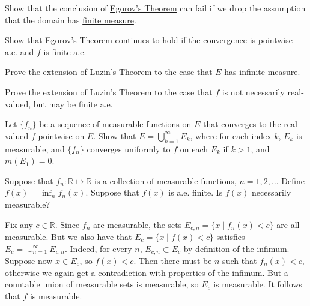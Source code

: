   \begin{exercise}[Royden 3.27]
    Show that the conclusion of \hyperref[thm:egorovs-theorem]{Egorov's Theorem} can fail if we drop the assumption that the domain has \hyperref[def:finite-measure]{finite measure}.
  \end{exercise}

  \begin{exercise}[Royden 3.28]
    Show that \hyperref[thm:egorovs-theorem]{Egorov's Theorem} continues to hold if the convergence is pointwise a.e. and $f$ is finite a.e.
  \end{exercise}

  \begin{exercise}[Royden 3.29]
    Prove the extension of Luzin's Theorem to the case that $E$ has infinite measure.
  \end{exercise}

  \begin{exercise}[Royden 3.30]
    Prove the extension of Luzin's Theorem to the case that $f$ is not necessarily real-valued, but may be finite a.e.
  \end{exercise}

  \begin{exercise}[Royden 3.31]
    Let $\{f_n\}$ be a sequence of \hyperref[def:measurable-function]{measurable functions} on $E$ that converges to the real-valued $f$ pointwise on $E$. Show that $E = \bigcup_{k=1}^{\infty} E_k$, where for each index $k$, $E_k$ is measurable, and $\{f_n\}$ converges uniformly to $f$ on each $E_k$ if $k > 1$, and $m(E_1) = 0$.
  \end{exercise}

  \begin{exercise}
    Suppose that $f_n : \mathbb{R} \mapsto \mathbb{R}$ is a collection of \hyperref[def:measurable-function]{measurable functions}, $n = 1, 2, \dots$ Define $f(x) = \inf_n f_n(x)$. Suppose that $f(x)$ is a.e. finite. Is $f(x)$ necessarily measurable?
  \end{exercise}
  \begin{solution}
    Fix any $c \in \mathbb{R}$. Since $f_n$ are measurable, the sets $E_{c,n} = \{x \mid f_n(x) < c\}$ are all measurable. But we also have that $E_c = \{x \mid f(x) < c\}$ satisfies $E_c = \cup_{n=1}^\infty E_{c,n}$. Indeed, for every $n$, $E_{c,n} \subset E_c$ by definition of the infimum. Suppose now $x \in E_c$, so $f(x) < c$. Then there must be $n$ such that $f_n(x) < c$, otherwise we again get a contradiction with properties of the infimum. But a countable union of measurable sets is measurable, so $E_c$ is measurable. It follows that $f$ is measurable.
  \end{solution}

